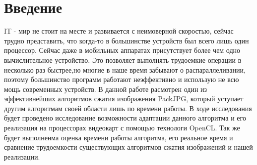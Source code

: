\documentclass{matmex-diploma-custom}
\begin{document}
\maketitle
\tableofcontents
\newpage
\section*{Введение}
IT - мир не стоит на  месте и развивается с неимоверной скоростью, сейчас трудно представить, что когда-то в большинстве устройств был всего лишь один процессор. Сейчас даже в мобильных аппаратах присутствует более чем одно вычислительное устройство. Это позволяет выполнять трудоемкие операции в несколько раз быстрее,но многие в наше время забывают о распараллеливании, поэтому большинство программ работают неэффективно и использую не всю мощь современных устройств. В данной работе расмотрен один из эффективнейших алгоритмов сжатия изображения PackJPG, который уступает другим алгоритмам своей области лишь по времени работы. В ходе исследования будет проведено исследование возможности адаптации данного алгоритма и его реализация на процессорах видеокарт с помощью технологи OpenCL. Так же будет выполненма оценка времени работы алгоритма, его реальное время и сравнение трудоемкости существующих алгоритмов сжатия изображений и  нашей реализации.
\end{document}
